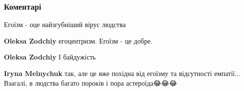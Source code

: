  
 
 
 
 
\subsubsection{Коментарі}
\label{sec:05_08_2021.fb.cholij_bogdan.1.virus_kakaja_raznica.cmt}

\begin{itemize}
 
Егоїзм - оце найзгубніший вірус людства

\begin{itemize}
 
\textbf{Oleksa Zodchiy} егоцентризм. Егоїзм - це добре.

 
\textbf{Oleksa Zodchiy}
І байдужість

 
\textbf{Iryna Melnychuk} так, але це вже похідна від егоїзму та відсутності емпатії... Взагалі, в людства багато пороків і пора астероїда😂😂😂
\end{itemize}

 

\end{itemize}
